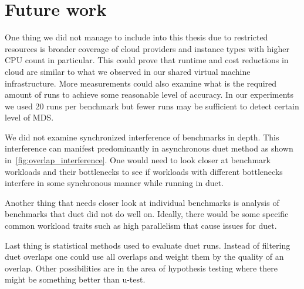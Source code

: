 \section{Future work}
One thing we did not manage to include into this thesis due to restricted resources is broader coverage of cloud providers and instance types with higher CPU count in particular.
This could prove that runtime and cost reductions in cloud are similar to what we observed in our shared virtual machine infrastructure.
More measurements could also examine what is the required amount of runs to achieve some reasonable level of accuracy.
In our experiments we used 20 runs per benchmark but fewer runs may be sufficient to detect certain level of MDS.

We did not examine synchronized interference of benchmarks in depth.
This interference can manifest predominantly in asynchronous duet method as shown in~\cref{fig:overlap_interference}.
One would need to look closer at benchmark workloads and their bottlenecks to see if workloads with different bottlenecks interfere in some synchronous manner while running in duet.

Another thing that needs closer look at individual benchmarks is analysis of benchmarks that duet did not do well on.
Ideally, there would be some specific common workload traits such as high parallelism that cause issues for duet.

Last thing is statistical methods used to evaluate duet runs.
Instead of filtering duet overlaps one could use all overlaps and weight them by the quality of an overlap.
Other possibilities are in the area of hypothesis testing where there might be something better than \mbox{u-test}.
